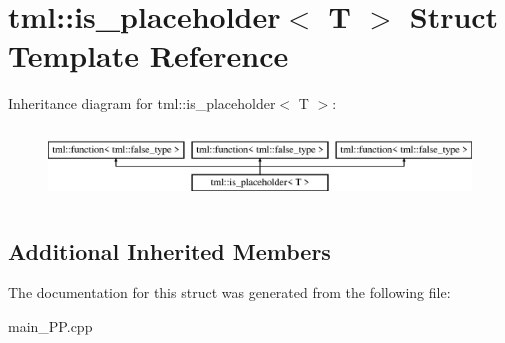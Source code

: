 \hypertarget{structtml_1_1is__placeholder}{\section{tml\+:\+:is\+\_\+placeholder$<$ T $>$ Struct Template Reference}
\label{structtml_1_1is__placeholder}
}
Inheritance diagram for tml\+:\+:is\+\_\+placeholder$<$ T $>$\+:\begin{figure}[H]
\begin{center}
\leavevmode
\includegraphics[height=1.975309cm]{structtml_1_1is__placeholder}
\end{center}
\end{figure}
\subsection*{Additional Inherited Members}


The documentation for this struct was generated from the following file\+:\begin{DoxyCompactItemize}
\item 
main\+\_\+\+P\+P.\+cpp\end{DoxyCompactItemize}
